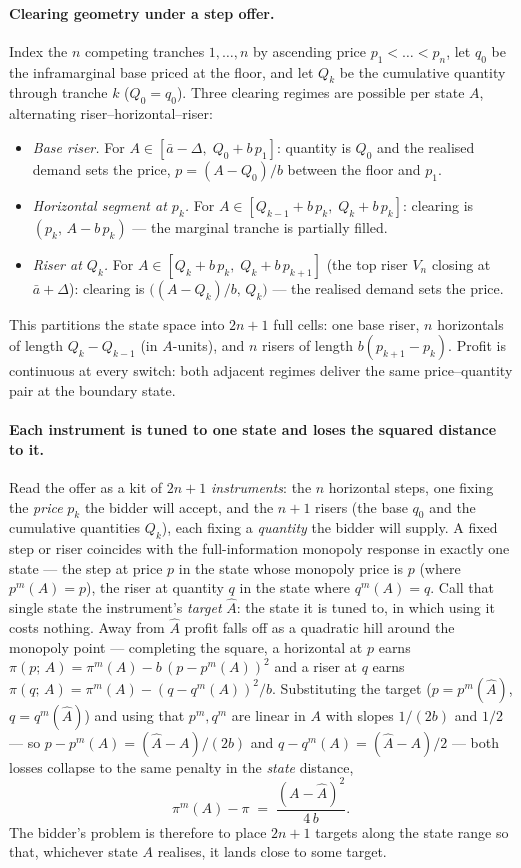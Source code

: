 \documentclass[11pt,a4paper]{article}
\theoremstyle{definition}
\theoremstyle{remark}
\theoremstyle{plain}
\begin{document}
\paragraph{Clearing geometry under a step offer.} Index the $n$ competing tranches $1, \dots, n$ by ascending price $p_1 < \dots < p_n$, let $q_0$ be the inframarginal base priced at the floor, and let $Q_k$ be the cumulative quantity through tranche $k$ ($Q_0 = q_0$). Three clearing regimes are possible per state $A$, alternating riser--horizontal--riser:
\begin{itemize}\setlength{\itemsep}{1pt}
\item[$(V_0)$] \emph{Base riser.} For $A \in [\bar a - \Delta,\; Q_0 + b\,p_1]$: quantity is $Q_0$ and the realised demand sets the price, $p = (A - Q_0)/b$ between the floor and $p_1$.
\item[$(H_k)$] \emph{Horizontal segment at $p_k$.} For $A \in [Q_{k-1} + b\,p_k,\; Q_k + b\,p_k]$: clearing is $(p_k,\, A - b\,p_k)$ --- the marginal tranche is partially filled.
\item[$(V_k)$] \emph{Riser at $Q_k$.} For $A \in [Q_k + b\,p_k,\; Q_k + b\,p_{k+1}]$ (the top riser $V_n$ closing at $\bar a + \Delta$): clearing is $\bigl((A - Q_k)/b,\, Q_k\bigr)$ --- the realised demand sets the price.
\end{itemize}
This partitions the state space into $2n+1$ full cells: one base riser, $n$ horizontals of length $Q_k - Q_{k-1}$ (in $A$-units), and $n$ risers of length $b(p_{k+1} - p_k)$. Profit is continuous at every switch: both adjacent regimes deliver the same price--quantity pair at the boundary state.

\paragraph{Each instrument is tuned to one state and loses the squared distance to it.} Read the offer as a kit of $2n+1$ \emph{instruments}: the $n$ horizontal steps, one fixing the \emph{price} $p_k$ the bidder will accept, and the $n+1$ risers (the base $q_0$ and the cumulative quantities $Q_k$), each fixing a \emph{quantity} the bidder will supply. A fixed step or riser coincides with the full-information monopoly response in exactly one state --- the step at price $p$ in the state whose monopoly price is $p$ (where $p^m(A)=p$), the riser at quantity $q$ in the state where $q^m(A)=q$. Call that single state the instrument's \emph{target} $\hat A$: the state it is tuned to, in which using it costs nothing. Away from $\hat A$ profit falls off as a quadratic hill around the monopoly point --- completing the square, a horizontal at $p$ earns $\pi(p;\, A) = \pi^m(A) - b\,(p - p^m(A))^2$ and a riser at $q$ earns $\pi(q;\, A) = \pi^m(A) - (q - q^m(A))^2/b$. Substituting the target ($p = p^m(\hat A)$, $q = q^m(\hat A)$) and using that $p^m, q^m$ are linear in $A$ with slopes $1/(2b)$ and $1/2$ --- so $p - p^m(A) = (\hat A - A)/(2b)$ and $q - q^m(A) = (\hat A - A)/2$ --- both losses collapse to the same penalty in the \emph{state} distance,
\[
\pi^m(A) - \pi \;=\; \frac{(A - \hat A)^2}{4\,b}.
\]
The bidder's problem is therefore to place $2n+1$ targets along the state range so that, whichever state $A$ realises, it lands close to some target.
\end{document}
